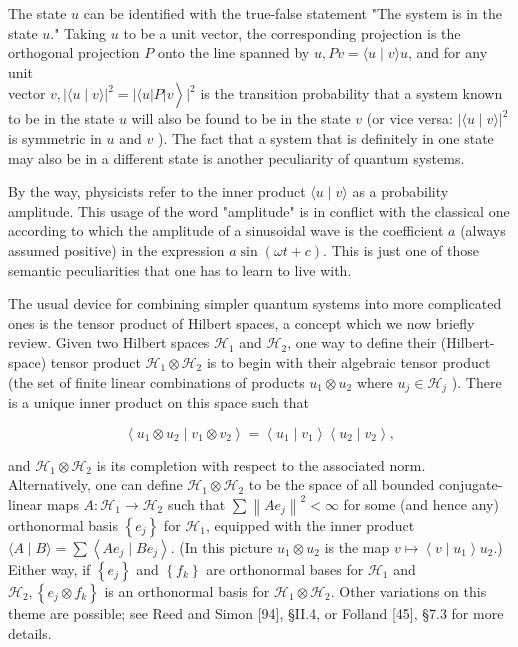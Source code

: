 \documentclass[10pt, letterpaper]{article}
\begin{document}
The state $u$ can be identified with the true-false statement "The system is in the state $u$." Taking $u$ to be a unit vector, the corresponding projection is the orthogonal projection $P$ onto the line spanned by $u, P v=\langle u \mid v\rangle u$, and for any unit\\
vector $\left.v,|\langle u \mid v\rangle|^{2}=|\langle u| P| v\right\rangle\left.\right|^{2}$ is the transition probability that a system known to be in the state $u$ will also be found to be in the state $v$ (or vice versa: $|\langle u \mid v\rangle|^{2}$ is symmetric in $u$ and $v$ ). The fact that a system that is definitely in one state may also be in a different state is another peculiarity of quantum systems.

By the way, physicists refer to the inner product $\langle u \mid v\rangle$ as a probability amplitude. This usage of the word "amplitude" is in conflict with the classical one according to which the amplitude of a sinusoidal wave is the coefficient $a$ (always assumed positive) in the expression $a \sin (\omega t+c)$. This is just one of those semantic peculiarities that one has to learn to live with.

The usual device for combining simpler quantum systems into more complicated ones is the tensor product of Hilbert spaces, a concept which we now briefly review. Given two Hilbert spaces $\mathcal{H}_{1}$ and $\mathcal{H}_{2}$, one way to define their (Hilbert-space) tensor product $\mathcal{H}_{1} \otimes \mathcal{H}_{2}$ is to begin with their algebraic tensor product (the set of finite linear combinations of products $u_{1} \otimes u_{2}$ where $u_{j} \in \mathcal{H}_{j}$ ). There is a unique inner product on this space such that

$$
\left\langle u_{1} \otimes u_{2} \mid v_{1} \otimes v_{2}\right\rangle=\left\langle u_{1} \mid v_{1}\right\rangle\left\langle u_{2} \mid v_{2}\right\rangle,
$$

and $\mathcal{H}_{1} \otimes \mathcal{H}_{2}$ is its completion with respect to the associated norm. Alternatively, one can define $\mathcal{H}_{1} \otimes \mathcal{H}_{2}$ to be the space of all bounded conjugate-linear maps $A: \mathcal{H}_{1} \rightarrow \mathcal{H}_{2}$ such that $\sum\left\|A e_{j}\right\|^{2}<\infty$ for some (and hence any) orthonormal basis $\left\{e_{j}\right\}$ for $\mathcal{H}_{1}$, equipped with the inner product $\langle A \mid B\rangle=\sum\left\langle A e_{j} \mid B e_{j}\right\rangle$. (In this picture $u_{1} \otimes u_{2}$ is the map $v \mapsto\left\langle v \mid u_{1}\right\rangle u_{2}$.) Either way, if $\left\{e_{j}\right\}$ and $\left\{f_{k}\right\}$ are orthonormal bases for $\mathcal{H}_{1}$ and $\mathcal{H}_{2},\left\{e_{j} \otimes f_{k}\right\}$ is an orthonormal basis for $\mathcal{H}_{1} \otimes \mathcal{H}_{2}$. Other variations on this theme are possible; see Reed and Simon [94], §II.4, or Folland [45], §7.3 for more details.
\end{document}
